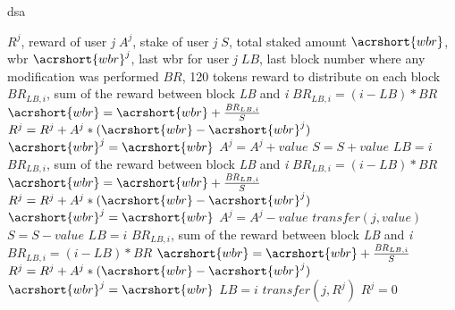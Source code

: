 \documentclass[a4paper]{article}
\begin{document}
\begin{algorithm}[H]
\caption{\acrlong{dsa}}
\label{alg:algo_1}
\begin{algorithmic}
\Variables
	\State $R^j$, reward of user \textit{j}
	\State $A^j$, stake of user \textit{j}
	\State $S$, total staked amount
	\State $\acrshort{wbr}$, \acrlong{wbr}
	\State $\acrshort{wbr}^j$, last \acrlong{wbr} for user \textit{j}
	\State $\mathit{LB}$, last block number where any modification was performed
	\State $\mathit{BR}$, 120 tokens reward to distribute on each block
\EndVariables
{}
  \State $\mathit{BR}_{LB,i}$, sum of the reward between block \textit{LB} and \textit{i}
  \State $\mathit{BR}_{LB,i} = (i - \mathit{LB}) * BR$
    \State $\acrshort{wbr} = \acrshort{wbr} + \frac{\mathit{BR}_{LB,i}}{S}$
  \EndIf
  \State $R^j = R^j + A^j * (\acrshort{wbr} - \acrshort{wbr}^j)$
  \State $\acrshort{wbr}^j = \acrshort{wbr}$
  \State $A^j = A^j + \mathit{value}$
  \State $S = S + \mathit{value}$
  \State $\mathit{LB} = i$
\EndProcedure
{}
  \State $\mathit{BR}_{LB,i}$, sum of the reward between block \textit{LB} and \textit{i}
  \State $\mathit{BR}_{LB,i} = (i - \mathit{LB}) * BR$
    \State $\acrshort{wbr} = \acrshort{wbr} + \frac{\mathit{BR}_{LB,i}}{S}$
  \EndIf
  \State $R^j = R^j + A^j * (\acrshort{wbr} - \acrshort{wbr}^j)$
  \State $\acrshort{wbr}^j = \acrshort{wbr}$
  \State $A^j = A^j - \mathit{value}$
  \State $\mathit{transfer}(j,value)$
  \State $S = S - \mathit{value}$
  \State $\mathit{LB} = i$
\EndProcedure
{}
  \State $\mathit{BR}_{LB,i}$, sum of the reward between block \textit{LB} and \textit{i}
  \State $\mathit{BR}_{LB,i} = (i - \mathit{LB}) * BR$
    \State $\acrshort{wbr} = \acrshort{wbr} + \frac{\mathit{BR}_{LB,i}}{S}$
  \EndIf
  \State $R^j = R^j + A^j * (\acrshort{wbr} - \acrshort{wbr}^j)$
  \State $\acrshort{wbr}^j = \acrshort{wbr}$
  \State $\mathit{LB} = i$
	\State $\mathit{transfer}(j,R^j)$
	\State $R^j = 0$
\EndProcedure
\end{algorithmic}
\end{algorithm}
\clearpage
\end{document}
